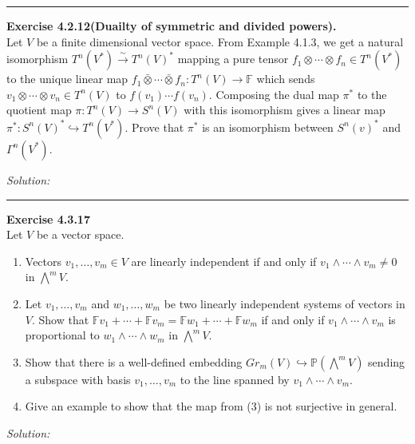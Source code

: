 \documentclass[a4paper, 12pt]{article}
\newenvironment{problem}[2][Exercise]
    { \begin{mdframed}[backgroundcolor=gray!20] \textbf{#1 #2} \\}
    {  \end{mdframed}}
\newenvironment{solution}
    {\textit{Solution:}}
    {}
\begin{document}
\noindent\rule{7in}{2.8pt}
\begin{problem}{4.2.12(Duailty of symmetric and divided powers).}
Let \(V\) be a finite dimensional vector space. From Example 4.1.3, we get a natural isomorphism \(T^n(V^*)\xrightarrow{\sim} T^n(V)^*\) mapping a pure tensor 
\(f_1\otimes \cdots\otimes f_n\in T^n(V^*)\) to the unique linear map \(f_1\bar{\otimes} \cdots\bar{\otimes}f_n:T^n(V)\rightarrow \mathbb{F} \) which sends \(v_1\otimes \cdots\otimes v_n\in T^n(V)\) to 
\(f(v_1)\cdots f(v_n)\). Composing the dual map \(\pi^*\) to the quotient map \(\pi:T^n(V)\rightarrow S^n(V)\) with this isomorphism gives a linear map \(\pi^*:S^n(V)^*\hookrightarrow T^n(V^*)\). Prove 
that \(\pi^*\) is an isomorphism between \(S^n(v)^*\) and \(\Gamma^n(V^*)\).
\end{problem}
\begin{solution}
	
\end{solution}

\noindent\rule{7in}{2.8pt}
\begin{problem}{4.3.17}
Let \(V\) be a vector space.
\begin{enumerate}[(1)]
\item Vectors \(v_1,\ldots,v_m\in V\) are linearly independent if and only if \(v_1\wedge \cdots\wedge v_m\neq 0\) in \(\bigwedge^m V\).
\item Let \(v_1,\ldots,v_m\) and \(w_1,\ldots,w_m\) be two linearly independent systems of vectors in \(V\). Show that \(\mathbb{F}v_1+\cdots+\mathbb{F}v_m=\mathbb{F}w_1+\cdots+\mathbb{F}w_m\) 
      if and only if \(v_1\wedge \cdots\wedge v_m\) is proportional to \(w_1\wedge \cdots\wedge w_m\) in \(\bigwedge^m V\).
\item Show that there is a well-defined embedding \(Gr_m(V)\hookrightarrow \mathbb{P}(\bigwedge^m V)\) sending a subspace with basis \(v_1,\ldots,v_m\) to the line spanned by \(v_1\wedge\cdots\wedge v_m\).
\item Give an example to show that the map from (3) is not surjective in general.
\end{enumerate}
\end{problem}
\begin{solution}
	
\end{solution}
\end{document}
